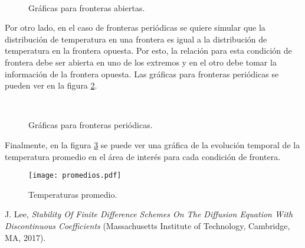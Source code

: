 \documentclass{article}
\begin{document}
\begin{figure}[h]
\centering
     \\
    \caption{Gráficas para fronteras abiertas.}
    \label{fig:abiertas}
\end{figure}
Por otro lado, en el caso de fronteras periódicas se quiere simular que la distribución de temperatura en una frontera es igual a la distribución de temperatura en la frontera opuesta. Por esto, la relación para esta condición de frontera debe ser abierta en uno de los extremos y en el otro debe tomar la información de la frontera opuesta. Las gráficas para fronteras periódicas se pueden ver en la figura \ref{fig:periodicas}.

\begin{figure}[h]
\centering
     \\
    \caption{Gráficas para fronteras periódicas.}
    \label{fig:periodicas}
\end{figure}

Finalmente, en la figura \ref{fig:promedios} se puede ver una gráfica de la evolución temporal de la temperatura promedio en el área de interés para cada condición de frontera.

\begin{figure}[h]
	\centering
	\texttt{[image: promedios.pdf]}
	\caption{Temperaturas promedio.}
	\label{fig:promedios}
\end{figure} 

\begin{thebibliography}{}
J. Lee, \textit{Stability Of Finite Difference Schemes On The Diffusion Equation With Discontinuous Coefficients} (Massachusetts Institute of Technology, Cambridge, MA, 2017).

\end{thebibliography}
\end{document}
